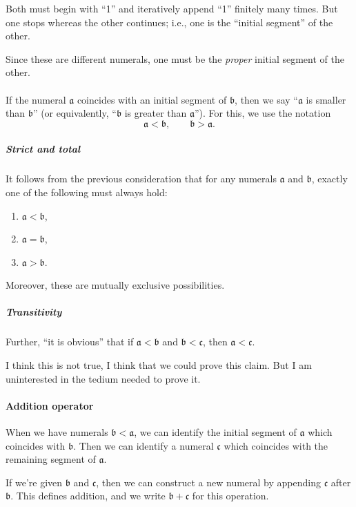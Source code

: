 Both must begin with ``1'' and iteratively append ``1'' finitely many
times. But one stops whereas the other continues; i.e., one is the
``initial segment'' of the other.

Since these are different numerals, one must be the \emph{proper}
initial segment of the other.

\paragraph{} %
If the numeral $\mathfrak{a}$ coincides with an initial segment of
$\mathfrak{b}$, then we say ``$\mathfrak{a}$ is smaller than $\mathfrak{b}$''
(or equivalently, ``$\mathfrak{b}$ is greater than $\mathfrak{a}$'').
For this, we use the notation
\begin{equation*}
\mathfrak{a}<\mathfrak{b},\qquad\mathfrak{b}>\mathfrak{a}.
\end{equation*}

\subparagraph{Strict and total}
It follows from the previous consideration that for any numerals
$\mathfrak{a}$ and $\mathfrak{b}$, exactly one of the following must
always hold:
\begin{enumerate}
\item $\mathfrak{a} < \mathfrak{b}$,
\item $\mathfrak{a} = \mathfrak{b}$,
\item $\mathfrak{a} > \mathfrak{b}$.
\end{enumerate}
Moreover, these are mutually exclusive possibilities.

\subparagraph{Transitivity}
Further, ``it is obvious'' that
if $\mathfrak{a}<\mathfrak{b}$ and $\mathfrak{b}<\mathfrak{c}$,
then $\mathfrak{a}<\mathfrak{c}$.

I think this is not true, I think that we could prove this claim. But
I am uninterested in the tedium needed to prove it.

\paragraph{Addition operator} %
When we have numerals $\mathfrak{b}<\mathfrak{a}$, we can identify the
initial segment of $\mathfrak{a}$ which coincides with
$\mathfrak{b}$. Then we can identify a numeral $\mathfrak{c}$ which
coincides with the remaining segment of $\mathfrak{a}$.

If we're given $\mathfrak{b}$ and $\mathfrak{c}$, then we can
construct a new numeral by appending $\mathfrak{c}$ after
$\mathfrak{b}$. This defines addition, and we write
$\mathfrak{b}+\mathfrak{c}$ for this operation.

